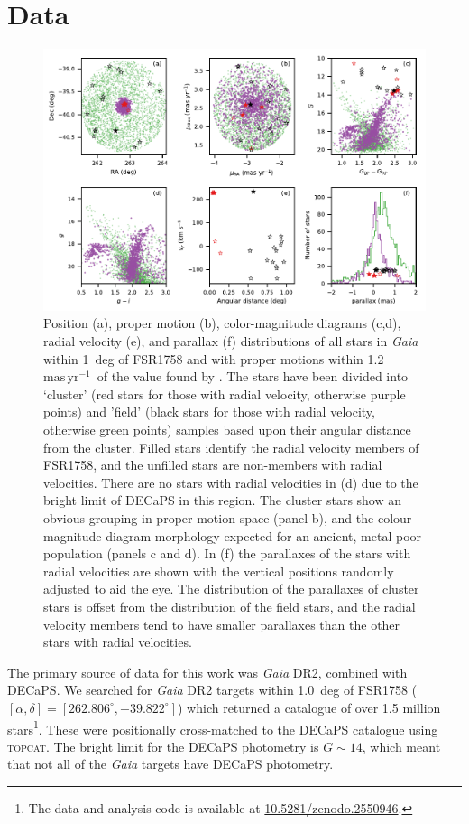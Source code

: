 \documentclass[fleqn,usenatbib,letters]{mnras}
\newcommand{\masyr}{~\ensuremath{\textrm{mas}\,\textrm{yr}^{-1}}}
\begin{document}
\section{Data}\label{sec:data}
\begin{figure}
\includegraphics[width=\textwidth]{figures/cmd.pdf}
\caption{Position (a), proper motion (b), color-magnitude diagrams (c,d), radial velocity (e), and parallax (f) distributions of all stars in \textit{Gaia} within 1~deg of FSR1758 and with proper motions within 1.2~\masyr\ of the value found by . The stars have been divided into `cluster' (red stars for those with radial velocity, otherwise purple points) and 'field' (black stars for those with radial velocity, otherwise green points) samples based upon their angular distance from the cluster. Filled stars identify the radial velocity members of FSR1758, and the unfilled stars are non-members with radial velocities. There are no stars with radial velocities in (d) due to the bright limit of DECaPS in this region. The cluster stars show an obvious grouping in proper motion space (panel b), and the colour-magnitude diagram morphology expected for an ancient, metal-poor population (panels c and d). In (f) the parallaxes of the stars with radial velocities are shown with the vertical positions randomly adjusted to aid the eye. The distribution of the parallaxes of cluster stars is offset from the distribution of the field stars, and the radial velocity members tend to have smaller parallaxes than the other stars with radial velocities.}
\label{fig:cmd}
\end{figure}

The primary source of data for this work was \textit{Gaia} DR2, combined with DECaPS. We searched for \textit{Gaia} DR2 targets within 1.0~deg of FSR1758 ($[\alpha,\delta]=[262.806^\circ,-39.822^\circ]$) which returned a catalogue of over 1.5 million stars\footnote{The data and analysis code is available at \url{10.5281/zenodo.2550946}.}. These were positionally cross-matched to the DECaPS catalogue using \textsc{topcat}. The bright limit for the DECaPS photometry is $G\sim14$, which meant that not all of the \textit{Gaia} targets have DECaPS photometry.
\end{document}
